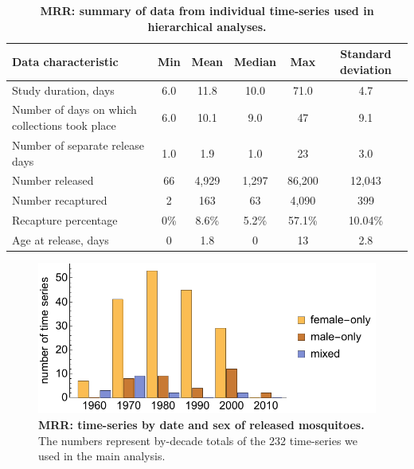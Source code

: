 \documentclass[12pt]{article}
\begin{document}
\begin{table}[htbp]
	\centering
	\footnotesize
	\begin{adjustwidth}{-0.5in}{-0.5in}%
		\begin{tabularx}{1.25\textwidth}{l|ccccc}
			\toprule
			\textbf{Data characteristic} & \textbf{Min} & \textbf{Mean} & \textbf{Median} & \textbf{Max} & \textbf{Standard deviation} \\
			\midrule
			Study duration, days & 6.0   & 11.8  & 10.0  & 71.0    & 4.7 \\
			Number of days on which collections took place & 6.0   & 10.1  & 9.0   & 47    & 9.1 \\
			Number of separate release days & 1.0     & 1.9   & 1.0     & 23    & 3.0 \\
			Number released & 66    & 4,929  & 1,297  & 86,200 & 12,043 \\
			Number recaptured & 2     & 163   & 63    & 4,090  & 399 \\
			Recapture percentage & 0\% & 8.6\% & 5.2\% & 57.1\% & 10.04\% \\
			Age at release, days & 0   & 1.8   & 0   & 13    & 2.8 \\
			\bottomrule
		\end{tabularx}%
		\caption{\textbf{MRR: summary of data from individual time-series used in hierarchical analyses.}}
		\label{tab:mrr_IndividualData}%
	\end{adjustwidth}
\end{table}%

\begin{figure}[h]
	\centerline{\includegraphics[width=1\textwidth]{./Figure_files/mrr_sexReleasesOverTime.pdf}}
	\caption{\textbf{MRR: time-series by date and sex of released mosquitoes.} The numbers represent by-decade totals of the 232 time-series we used in the main analysis.}
	\label{fig:mrr_sexReleasesOverTime}
\end{figure}
\end{document}
